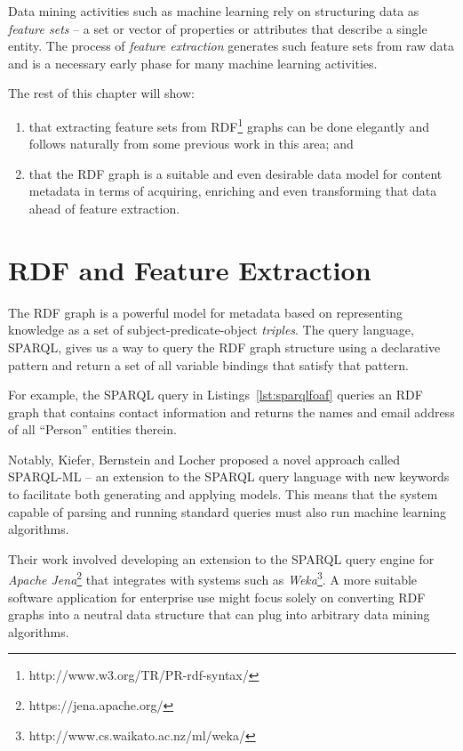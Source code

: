 \documentclass[10pt,a4paper]{report}
\begin{document}
Data mining activities such as machine learning rely on structuring data as
\emph{feature sets}\cite{bishop2006pattern} -- a set or vector of properties or
attributes that describe a single entity.
The process of \emph{feature extraction}
generates such feature sets from raw data and is a necessary early phase for
many machine learning activities.

The rest of this chapter will show:

\begin{enumerate}
\item that extracting feature sets from RDF\footnote{http://www.w3.org/TR/PR-rdf-syntax/} graphs can be done elegantly and follows naturally from some
previous work in this area; and
\item that the RDF graph is a suitable and even desirable data model for content
metadata in terms of acquiring, enriching and even transforming that data ahead
of feature extraction.
\end{enumerate}

\section{RDF and Feature Extraction}

The RDF graph is a powerful model
for metadata based on representing knowledge as a set of
subject-predicate-object \emph{triples}. The query language, SPARQL, gives us a
way to query the RDF graph structure using a declarative pattern and return a
set of all variable bindings that satisfy that pattern.

For example, the SPARQL query in Listings~\ref{lst:sparqlfoaf}
queries an RDF graph that contains contact information and returns the
names and email address of all ``Person'' entities therein.

Notably, Kiefer, Bernstein and Locher\cite{kiefer2008adding} proposed a novel
approach called SPARQL-ML -- an extension to the
SPARQL\cite{segaran2009programming} query language with new keywords to
facilitate both generating and applying models. This means that the system
capable of parsing and running standard queries must also run machine learning
algorithms.

Their work involved developing an extension to the SPARQL query
engine for \emph{Apache Jena}\footnote{https://jena.apache.org/} that integrates
with systems such as \emph{Weka}\footnote{http://www.cs.waikato.ac.nz/ml/weka/}.
A more suitable software application for enterprise use might focus solely on
converting RDF graphs into a neutral data structure that can plug into arbitrary
data mining algorithms.
\end{document}

